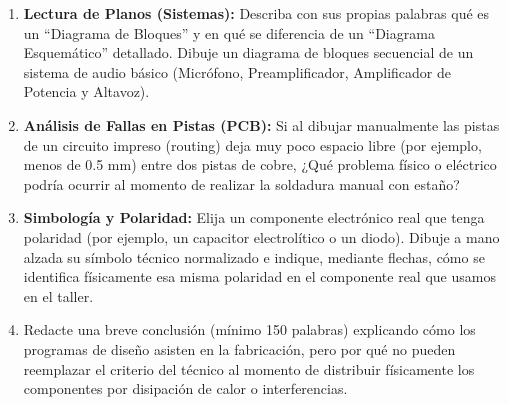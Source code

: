 \documentclass[../main]{subfiles}
\begin{document}
\begin{enumerate}
    gruesa y una línea de trazos (punteada)? Dibuje un ejemplo simple
    de un cubo hueco aplicando ambas líneas.
  \item \textbf{Lectura de Planos (Sistemas):} Describa con sus
    propias palabras qué es un ``Diagrama de Bloques'' y en qué se
    diferencia de un ``Diagrama Esquemático'' detallado. Dibuje un
    diagrama de bloques secuencial de un sistema de audio básico
    (Micrófono, Preamplificador, Amplificador de Potencia y Altavoz).
  \item \textbf{Análisis de Fallas en Pistas (PCB):} Si al dibujar
    manualmente las pistas de un circuito impreso (routing) deja muy
    poco espacio libre (por ejemplo, menos de 0.5 mm) entre dos
    pistas de cobre, ¿Qué problema físico o eléctrico podría ocurrir
    al momento de realizar la soldadura manual con estaño?
  \item \textbf{Simbología y Polaridad:} Elija un componente
    electrónico real que tenga polaridad (por ejemplo, un capacitor
    electrolítico o un diodo). Dibuje a mano alzada su símbolo
    técnico normalizado e indique, mediante flechas, cómo se
    identifica físicamente esa misma polaridad en el componente real
    que usamos en el taller.
  \item Redacte una breve conclusión (mínimo 150 palabras) explicando
    cómo los programas de diseño asisten en la fabricación,
    pero por qué no pueden reemplazar el criterio del técnico al
    momento de distribuir físicamente los componentes por disipación
    de calor o interferencias.
\end{enumerate}
\end{document}
